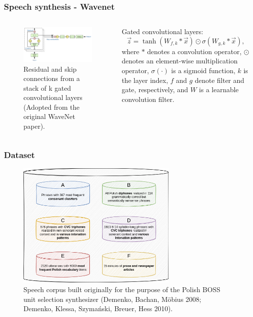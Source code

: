 \documentclass[a4paper,9pt]{beamer}
\theoremstyle{mytheoremstyle}
\begin{document}
\begin{frame}
\frametitle{Speech synthesis - Wavenet}
\begin{columns}
\begin{figure}
\begin{center}
  \includegraphics[width=\textwidth]{res/residual_blocks.png}
\end{center}
	\caption{Residual and skip connections from a stack of k gated convolutional layers (Adopted from the original WaveNet paper).}
\end{figure}
\begin{exampleblock}{}
\tiny{Gated convolutional layers:
\begin{equation}
\vec{z} = \tanh \left(W_{f, k} \ast \vec{x}\right) \odot \sigma \left(W_{g, k} \ast \vec{x} \right), 
\end{equation}
where $\ast$ denotes a convolution operator, $\odot$ denotes an element-wise multiplication operator, $\sigma(\cdot)$ is a sigmoid function, $k$ is the layer index, $f$ and $g$ denote filter and gate, respectively, and $W$ is a learnable convolution filter.}
\end{exampleblock}
\end{columns}
\end{frame}

\begin{frame}
\frametitle{Dataset}
\begin{figure}
\begin{center}
  \includegraphics[width=0.7\textwidth]{res/dataset_structure}
\end{center}
	\caption{Speech corpus built originally for the purpose of the Polish BOSS unit selection synthesizer (Demenko, Bachan, M{\"o}bius 2008; Demenko, Klessa, Szyma\'nski, Breuer, Hess 2010).}
\end{figure}
\end{frame}
\end{document}
